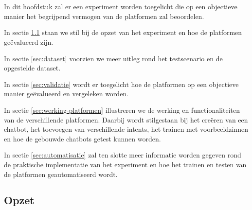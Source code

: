 
\chapter{}
\label{ch:methodologie}

In dit hoofdstuk zal er een experiment worden toegelicht die op een objectieve manier het begrijpend vermogen van de platformen zal beoordelen.

In sectie \ref{sec:opzet} staan we stil bij de opzet van het experiment en hoe de platformen geëvalueerd zijn.

In sectie \ref{sec:dataset} voorzien we meer uitleg rond het testscenario en de opgestelde dataset.

In sectie \ref{sec:validatie} wordt er toegelicht hoe de platformen op een objectieve manier geëvalueerd en vergeleken worden.

In sectie \ref{sec:werking-platformen} illustreren we de werking en functionaliteiten van de verschillende platformen. Daarbij wordt stilgestaan bij het creëren van een chatbot, het toevoegen van verschillende intents, het trainen met voorbeeldzinnen en hoe de gebouwde chatbots getest kunnen worden. 

In sectie \ref{sec:automatisatie} zal ten slotte meer informatie worden gegeven rond de praktische implementatie van het experiment en hoe het trainen en testen van de platformen geautomatiseerd wordt.


\section{Opzet}
\label{sec:opzet}

